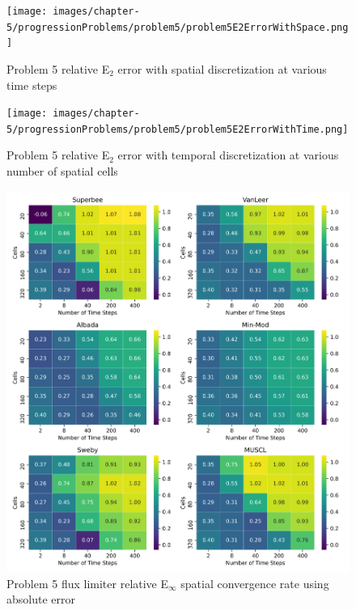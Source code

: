 \begin{figure}[p]
    \centering
    \texttt{[image: images/chapter-5/progressionProblems/problem5/problem5E2ErrorWithSpace.png]}
    \caption{Problem 5 relative E${}_{2}$ error with spatial discretization at various time steps }
    \label{fig:problem5_l2error_spatial_results}
\end{figure}

\clearpage

\begin{figure}[p]
    \centering
    \texttt{[image: images/chapter-5/progressionProblems/problem5/problem5E2ErrorWithTime.png]}
    \caption{Problem 5 relative E${}_{2}$ error with temporal discretization at various number of spatial cells}
    \label{fig:problem5_l2error_time_results}
\end{figure}

\clearpage

\begin{figure}[p]
    \centering
    \includegraphics[width=6in]{images/chapter-5/progressionProblems/problem5/problem5EinftyFluxLimiterConvergenceRate.png}
    \caption{Problem 5 flux limiter relative E${}_{\infty}$ spatial convergence rate using absolute error}
    \label{fig:problem5_linferror_fluxlimiter_convergence_rate}
\end{figure}

